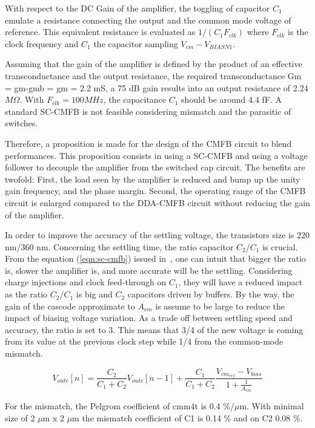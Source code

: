 With respect to the DC Gain of the amplifier, the toggling of capacitor \(C_1 \) emulate a resistance connecting the output and the common mode voltage of reference. This equivalent resistance is evaluated as \(1/(C_1 F_{clk}) \) where \(F_{clk} \) is the clock frequency and \(C_1 \) the capacitor sampling \(V_{cm}-V_{BIASN1}\). 

Assuming that the gain of the amplifier is defined by the product of an effective transconductance and the output resistance, the required transconductance Gm = gm-gmb = gm = 2.2 mS, a 75 dB gain results into an output resistance of 2.24 \(M\Omega \). With \(F_{clk} = 100 MHz \), the capacitance \(C_1 \) should be around 4.4 fF. A standard SC-CMFB is not feasible considering mismatch and the parasitic of switches.

Therefore, a proposition is made for the design of the CMFB circuit to blend performances. This proposition consists in using a SC-CMFB and using a voltage follower to decouple the amplifier from the switched cap circuit.
The benefits are twofold: First, the load seen by the amplifier is reduced and bump up the unity gain frequency, and the phase margin. Second, the operating range of the CMFB circuit is enlarged compared to the DDA-CMFB circuit without reducing the gain of the amplifier.

In order to improve the accuracy of the settling voltage, the transistors size is 220 nm/360 nm. Concerning the settling time, the ratio capacitor \(C_2/C_1 \) is crucial. From the equation (\ref{eqn:sc-cmfb}) issued in~\cite{Choksi2003}, one can intuit that bigger the ratio is, slower the amplifier is, and more accurate will be the settling. Considering charge injections and clock feed-through on \(C_1\), they will have a reduced impact as the ratio \(C_2/C_1\) is big and \(C_2\) capacitors driven by buffers. By the way, the gain of the cascode approximate to \(A_{cm} \) is assume to be large to reduce the impact of biasing voltage variation. As a trade off between settling speed and accuracy, the ratio is set to 3. This means that 3/4 of the new  voltage is coming from its value at the previous clock step while 1/4 from the common-mode mismatch.

\begin{equation}
    \label{eqn:sc-cmfb}
V_{outc}[n] = \frac{C_2}{C_1+C_2} V_{outc}[n-1] + \frac{C_1}{C_1+C_2} \frac{V_{cm_{ref}}-V_{bias}}{1+\frac{1}{A_{cm}}}
\end{equation}

For the mismatch, the Pelgrom coefficient of cmm4t is 0.4 \%/\(\mu \)m. With minimal size of 2 \(\mu \)m x 2 \(\mu \)m the mismatch coefficient of C1 is 0.14 \% and on C2 0.08 \%.

